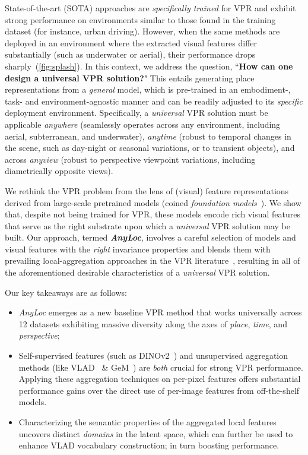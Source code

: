 \documentclass[letterpaper, 10 pt, conference]{ieeeconf}  \fi
\newcommand{\coolname}{\textit{AnyLoc}}
\begin{document}
State-of-the-art (SOTA) approaches are \emph{specifically trained} for VPR and exhibit strong performance on environments similar to those found in the training dataset (for instance, urban driving).
However, when the same methods are deployed in an environment where the extracted visual features differ substantially (such as underwater or aerial), their performance drops sharply~(\cref{fig:splash}).
In this context, we address the question, ``\textbf{How can one design a universal VPR solution?}"
This entails generating place representations from a \textit{general} model, which is pre-trained in an embodiment-, task- and environment-agnostic manner and can be readily adjusted to its \textit{specific} deployment environment.
Specifically, a \emph{universal} VPR solution must be applicable \emph{anywhere} (seamlessly operates across any environment, including aerial, subterranean, and underwater), \emph{anytime} (robust to temporal changes in the scene, such as day-night or seasonal variations, or to transient objects), and across \emph{anyview} (robust to perspective viewpoint variations, including diametrically opposite views).

We rethink the VPR problem from the lens of (visual) feature representations derived from large-scale pretrained models (coined \textit{foundation models}~\cite{fmodels}).
We show that, despite not being trained for VPR, these models encode rich visual features that serve as the right substrate upon which a \emph{universal} VPR solution may be built.
Our approach, termed \textbf{\coolname}, involves a careful selection of models and visual features with the \emph{right} invariance properties and blends them with prevailing local-aggregation approaches in the VPR literature~\cite{arandjelovic2016netvlad,berton2022deep,garrido2023on,shekhar2023objectives}, resulting in all of the aforementioned desirable characteristics of a \emph{universal} VPR solution.

\vspace{1em}

Our key takeaways are as follows:
\begin{itemize}
    \item \textit{AnyLoc} emerges as a new baseline VPR method that works universally across 12 datasets exhibiting massive diversity along the axes of \textit{place}, \textit{time}, and \textit{perspective};
    \item Self-supervised features (such as DINOv2~\cite{oquab2023dinov2}) and unsupervised aggregation methods (like VLAD~\cite{jegou2010aggregating} \& GeM~\cite{radenovic2018fine}) are \emph{both} crucial for strong VPR performance. Applying these aggregation techniques on per-pixel features offers substantial performance gains over the direct use of per-image features from off-the-shelf models.
    \item Characterizing the semantic properties of the aggregated local features uncovers distinct \emph{domains} in the latent space, which can further be used to enhance VLAD vocabulary construction; in turn boosting performance.
\end{itemize}
\end{document}

